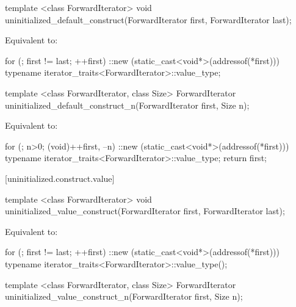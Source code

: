 %
\begin{itemdecl}
template <class ForwardIterator>
  void uninitialized_default_construct(ForwardIterator first, ForwardIterator last);
\end{itemdecl}

\begin{itemdescr}
\pnum
\effects
Equivalent to:
\begin{codeblock}
for (; first != last; ++first)
  ::new (static_cast<void*>(addressof(*first)))
    typename iterator_traits<ForwardIterator>::value_type;
\end{codeblock}
\end{itemdescr}

%
\begin{itemdecl}
template <class ForwardIterator, class Size>
  ForwardIterator uninitialized_default_construct_n(ForwardIterator first, Size n);
\end{itemdecl}

\begin{itemdescr}
\pnum
\effects
Equivalent to:
\begin{codeblock}
for (; n>0; (void)++first, --n)
  ::new (static_cast<void*>(addressof(*first)))
    typename iterator_traits<ForwardIterator>::value_type;
return first;
\end{codeblock}
\end{itemdescr}

[uninitialized.construct.value]{}

%
\begin{itemdecl}
template <class ForwardIterator>
  void uninitialized_value_construct(ForwardIterator first, ForwardIterator last);
\end{itemdecl}

\begin{itemdescr}
\pnum
\effects
Equivalent to:
\begin{codeblock}
for (; first != last; ++first)
  ::new (static_cast<void*>(addressof(*first)))
    typename iterator_traits<ForwardIterator>::value_type();
\end{codeblock}
\end{itemdescr}

%
\begin{itemdecl}
template <class ForwardIterator, class Size>
  ForwardIterator uninitialized_value_construct_n(ForwardIterator first, Size n);
\end{itemdecl}


